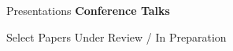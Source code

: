 \documentclass [11pt,letterpaper]{article}
\begin{document}
\begin{rSection}{\textrm{Presentations}}
%
{\large {\bf Conference Talks}}\begin{etaremune}


%

\end{etaremune}
\end{rSection}


\begin{rSection}{\textrm{Select Papers Under Review / In Preparation}}
\begin{etaremune}
%

%
\begin{comment}
%
%
%
\end{comment}
\end{etaremune}\end{rSection}
%
\end{document}
